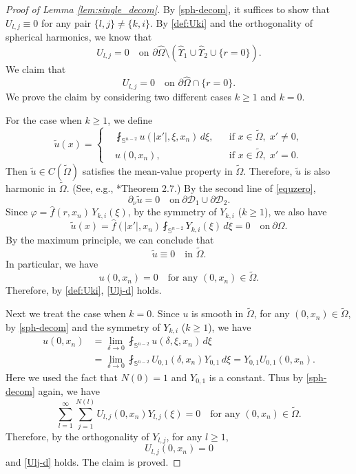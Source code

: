 \documentclass[reqno, 10pt]{amsart}
\theoremstyle{plain}
\theoremstyle{definition}
\theoremstyle{remark}
\numberwithin{equation}{section}
\newcommand{\bS}{\mathbb{S}}
\begin{document}
\begin{proof}[Proof of Lemma \ref{lem:single_decom}]
    By \eqref{sph-decom}, it suffices to show that $U_{l,j}\equiv 0$ for any pair $\{l,j\}\neq \{k,i\}$. By \eqref{def:Uki} and the orthogonality of spherical harmonics, we know that
\begin{equation}\label{bcd:Uki}
    U_{l,j}=0 \quad \mbox{on } \partial\hat{\Omega}\setminus(\hat\Upsilon_1\cup \hat\Upsilon_2\cup\{r=0\}).
\end{equation}   
We claim that
\begin{equation}\label{Ulj-d}
    U_{l,j}=0 \quad \mbox{on } \partial \hat\Omega\cap \{r=0\}.
\end{equation}
We prove the claim by considering two different cases $k\ge 1$ and $k=0$. 

For the case when $k\ge 1$, we define 
    $$
\tilde{u}(x)=\left\{
\begin{aligned}
   &\fint_{\bS^{n-2}}u(|x'|,\xi,x_n)\,d\xi, && \mbox{if } x\in \widetilde\Omega, \;x'\neq 0,\\
   &u(0,x_n), && \mbox{if } x\in \widetilde\Omega, \;x'= 0.
\end{aligned}
\right.
    $$
Then $\tilde{u}\in C(\widetilde\Omega)$ satisfies the mean-value property in $\widetilde{\Omega}$. Therefore, $\tilde{u}$ is also harmonic in $\widetilde\Omega$. (See, e.g., \cite{GT}*{Theorem 2.7}.) By the second line of \eqref{equzero}, 
\begin{equation*}%
   \partial_\nu \tilde{u}=0  \quad \mbox{on}~\partial\mathcal{D}_{1}\cup\partial\mathcal{D}_{2}.
\end{equation*}
Since $\varphi=\hat{f}(r,x_n)\,Y_{k,i}(\xi)$, by the symmetry of $Y_{k,i}$ ($k\ge 1$), we also have 
\begin{equation*}%
    \tilde{u}(x)=\hat{f}(|x'|,x_n)\fint_{\bS^{n-2}}Y_{k,i}(\xi)\,d\xi=0  \quad \mbox{on}~\partial\Omega.
\end{equation*}
By the maximum principle, we can conclude that
$$\tilde{u}\equiv 0 \quad \mbox{in } \widetilde\Omega.$$
In particular, we have 
$$u(0,x_n)=0 \quad \mbox{for any } (0,x_n)\in \widetilde\Omega.$$
Therefore, by \eqref{def:Uki}, \eqref{Ulj-d} holds.

Next we treat the case when $k=0$. Since $u$ is smooth in $\widetilde\Omega$, for any $(0,x_n)\in \widetilde\Omega$, by \eqref{sph-decom} and the symmetry of $Y_{k,i}$ ($k\ge 1$), we have 
$$
\begin{aligned}
    u(0,x_n)&=\lim_{\delta\to 0}\fint_{\bS^{n-2}}u(\delta,\xi,x_n)\,d\xi\\
    &=\lim_{\delta\to 0}\fint_{\bS^{n-2}}U_{0,1}(\delta,x_n)Y_{0,1}\,d\xi=Y_{0,1}U_{0,1}(0,x_n).
\end{aligned}
$$
Here we used the fact that $N(0)=1$ and $Y_{0,1}$ is a constant.
Thus by \eqref{sph-decom} again, we have
$$
\sum_{l=1}^\infty \sum_{j=1}^{N(l)} U_{l,j}(0,x_n)Y_{l,j}(\xi)=0 \quad \mbox{for any } (0,x_n)\in \widetilde\Omega.
$$
Therefore, by the orthogonality of $Y_{l,j}$, for any $l\ge 1$, $$U_{l,j}(0,x_n)=0$$
and \eqref{Ulj-d} holds. The claim is proved.


\end{proof}
\end{document}
